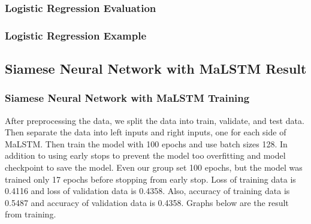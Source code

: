 \documentclass[12pt,oneside,openright,a4paper]{cpe-english-project}
\begin{document}
\subsubsection{Logistic Regression Evaluation}
\subsubsection{Logistic Regression Example}

\subsection{Siamese Neural Network with MaLSTM Result}
\subsubsection{Siamese Neural Network with MaLSTM Training}
After preprocessing the data, we split the data into train, validate, and test data. Then separate the data into left inputs and right inputs, one for each side of MaLSTM. Then train the model with 100 epochs and use batch sizes 128. In addition to using early stops to prevent the model too overfitting and model checkpoint to save the model. Even our group set 100 epochs, but the model was trained only 17 epochs before stopping from early stop. Loss of training data is 0.4116 and loss of validation data is 0.4358. Also, accuracy of training data is 0.5487 and accuracy of validation data is 0.4358. Graphs below are the result from training.
\end{document}
